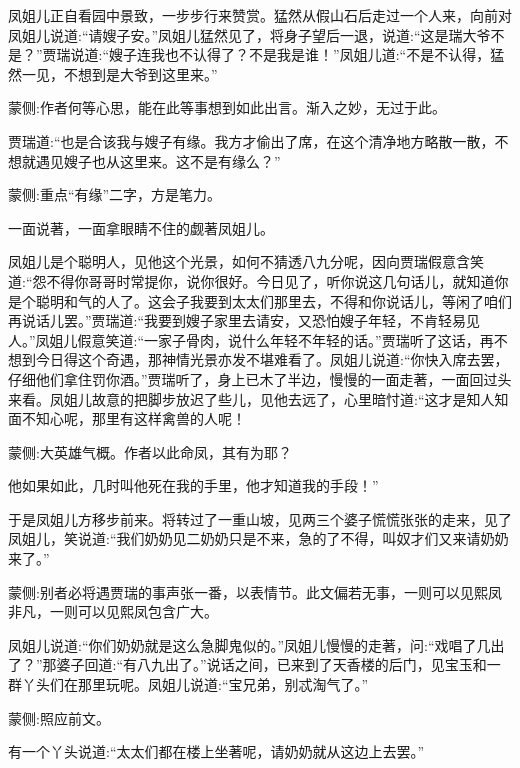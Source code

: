 \begin{parag}
    凤姐儿正自看园中景致，一步步行来赞赏。猛然从假山石后走过一个人来，向前对凤姐儿说道:“请嫂子安。”凤姐儿猛然见了，将身子望后一退，说道:“这是瑞大爷不是？”贾瑞说道:“嫂子连我也不认得了？不是我是谁！”凤姐儿道:“不是不认得，猛然一见，不想到是大爷到这里来。”\begin{note}蒙侧:作者何等心思，能在此等事想到如此出言。渐入之妙，无过于此。\end{note}贾瑞道:“也是合该我与嫂子有缘。我方才偷出了席，在这个清净地方略散一散，不想就遇见嫂子也从这里来。这不是有缘么？”\begin{note}蒙侧:重点“有缘”二字，方是笔力。\end{note}一面说著，一面拿眼睛不住的觑著凤姐儿。
\end{parag}


\begin{parag}
    凤姐儿是个聪明人，见他这个光景，如何不猜透八九分呢，因向贾瑞假意含笑道:“怨不得你哥哥时常提你，说你很好。今日见了，听你说这几句话儿，就知道你是个聪明和气的人了。这会子我要到太太们那里去，不得和你说话儿，等闲了咱们再说话儿罢。”贾瑞道:“我要到嫂子家里去请安，又恐怕嫂子年轻，不肯轻易见人。”凤姐儿假意笑道:“一家子骨肉，说什么年轻不年轻的话。”贾瑞听了这话，再不想到今日得这个奇遇，那神情光景亦发不堪难看了。凤姐儿说道:“你快入席去罢，仔细他们拿住罚你酒。”贾瑞听了，身上已木了半边，慢慢的一面走著，一面回过头来看。凤姐儿故意的把脚步放迟了些儿，见他去远了，心里暗忖道:“这才是知人知面不知心呢，那里有这样禽兽的人呢！\begin{note}蒙侧:大英雄气概。作者以此命凤，其有为耶？\end{note}他如果如此，几时叫他死在我的手里，他才知道我的手段！”
\end{parag}


\begin{parag}
    于是凤姐儿方移步前来。将转过了一重山坡，见两三个婆子慌慌张张的走来，见了凤姐儿，笑说道:“我们奶奶见二奶奶只是不来，急的了不得，叫奴才们又来请奶奶来了。”\begin{note}蒙侧:别者必将遇贾瑞的事声张一番，以表情节。此文偏若无事，一则可以见熙凤非凡，一则可以见熙凤包含广大。\end{note}凤姐儿说道:“你们奶奶就是这么急脚鬼似的。”凤姐儿慢慢的走著，问:“戏唱了几出了？”那婆子回道:“有八九出了。”说话之间，已来到了天香楼的后门，见宝玉和一群丫头们在那里玩呢。凤姐儿说道:“宝兄弟，别忒淘气了。”\begin{note}蒙侧:照应前文。\end{note}有一个丫头说道:“太太们都在楼上坐著呢，请奶奶就从这边上去罢。”
\end{parag}



